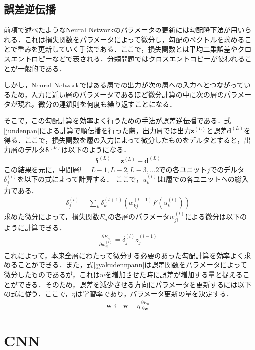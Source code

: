 \subsection{誤差逆伝播}
前項で述べたようなNeural Networkのパラメータの更新には勾配降下法が用いられる．これは損失関数をパラメータによって微分し，勾配のベクトルを求めることで重みを更新していく手法である．ここで，損失関数とは平均二乗誤差やクロスエントロピーなどで表される．分類問題ではクロスエントロピーが使われることが一般的である．

しかし，Neural Networkではある層での出力が次の層への入力へとつながっているため，入力に近い層のパラメータであるほど微分計算の中に次の層のパラメータが現れ，微分の連鎖則を何度も繰り返すことになる．

そこで，この勾配計算を効率よく行うための手法が誤差逆伝播である．式\ref{jundenpan}による計算で順伝播を行った際，出力層では出力$\bm{z}^{(L)}$と誤差$\bm{d}^{(L)}$を得る．ここで，損失関数を層の入力によって微分したものをデルタとすると，出力層のデルタ$\bm{\delta}^{(L)}$は以下のようになる．
\begin{align}
  \bm{\delta}^{(L)} = \bm{z}^{(L)} - \bm{d}^{(L)}
\end{align}
この結果を元に，中間層$l = L-1,L-2,L-3,\ldots 2$での各ユニット$j$でのデルタ$\delta^{(l)}_j$を以下の式によって計算する．
ここで，$u^{(l)}_k$はl層での各ユニットへの総入力である．
\begin{align}
  \delta^{(l)}_j = \sum_k \delta^{(l+1)}_k (w^{(l+1)}_{kj} f'(u^{(l)}_k))
\end{align}
求めた微分によって，損失関数$E_n$の各層のパラメータ$w^{(l)}_{ji}$による微分は以下のように計算できる．
\begin{align}
  \frac{\partial E_n}{\partial w^{(l)}_{ji}} = \delta^{(l)}_j z^{(l-1)}_j
  \label{gyakudennpann}
\end{align}
これによって，本来全層にわたって微分する必要のあった勾配計算を効率よく求めることができる．また，式\ref{gyakudennpann}は誤差関数をパラメータによって微分したものであるが，これは$w$を増加させた時に誤差が増加する量と捉えることができる．そのため，誤差を減少させる方向にパラメータを更新するには以下の式に従う．ここで，$\eta$は学習率であり，パラメータ更新の量を決定する．
\begin{align}
  \bm{w} \gets \bm{w} - \eta \frac{\partial E_n}{\partial \bm{w}}
\end{align}

\section{CNN}
